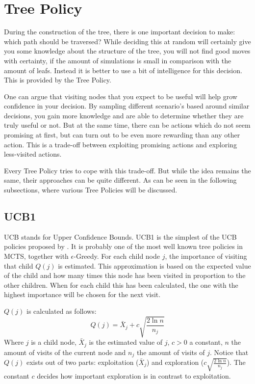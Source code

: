\section{Tree Policy}
\label{sec:tp}

During the construction of the tree, there is one important decision to make: which path should be traversed? While deciding this at random will certainly give you some knowledge about the structure of the tree, you will not find good moves with certainty, if the amount of simulations is small in comparison with the amount of leafs. Instead it is better to use a bit of intelligence for this decision. This is provided by the Tree Policy\cite{browne2012survey}. 

One can argue that visiting nodes that you expect to be useful will help grow confidence in your decision. By sampling different scenario's based around similar decisions, you gain more knowledge and are able to determine whether they are truly useful or not. But at the same time, there can be actions which do not seem promising at first, but can turn out to be even more rewarding than any other action. This is a trade-off between exploiting promising actions and exploring less-visited actions.

Every Tree Policy tries to cope with this trade-off. But while the idea remains the same, their approaches can be quite different. As can be seen in the following subsections, where various Tree Policies will be discussed.

\subsection{UCB1}
UCB stands for Upper Confidence Bounds. UCB1 is the simplest of the UCB policies proposed by \cite{auer2002finite}. It is probably one of the most well known tree policies in MCTS, together with $\epsilon$-Greedy. For each child node $j$, the importance of visiting that child $Q(j)$ is estimated. This approximation is based on the expected value of the child and how many times this node has been visited in proportion to the other children. When for each child this has been calculated, the one with the highest importance will be chosen for the next visit. 

$Q(j)$ is calculated as follows:
\begin{equation}
Q(j) = \bar{X}_j + c\sqrt{\frac{2 \ln n}{n_j}}
\end{equation}
Where $j$ is a child node, $\bar{X}_j$ is the estimated value of $j$, $c > 0$ a constant, $n$ the amount of visits of the current node and $n_j$ the amount of visits of $j$. Notice that $Q(j)$ exists out of two parts: exploitation ($\bar{X}_j$) and exploration ($c\sqrt{\frac{2 \ln n}{n_j}}$). The constant $c$ decides how important exploration is in contrast to exploitation. 

